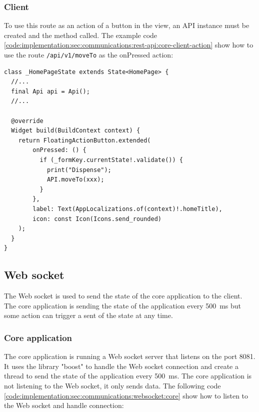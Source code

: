 \subsubsection{Client}
\label{ch:implementation:sec:communications:rest-api:client}

To use this route as an action of a button in the view, an API instance must be created and the method called.
The example code \ref{code:implementation:sec:communications:rest-api:core-client-action} show how to use the route \texttt{/api/v1/moveTo} as the onPressed action:

\begin{code}
  \label{code:implementation:sec:communications:rest-api:core-client-action}
  \begin{verbatim}
class _HomePageState extends State<HomePage> {
  //...
  final Api api = Api();
  //...

  @override
  Widget build(BuildContext context) {
    return FloatingActionButton.extended(
        onPressed: () {
          if (_formKey.currentState!.validate()) {
            print("Dispense");
            API.moveTo(xxx);
          }
        },
        label: Text(AppLocalizations.of(context)!.homeTitle),
        icon: const Icon(Icons.send_rounded)
    );
  }
}
  \end{verbatim}
\end{code}


\subsection{Web socket}
\label{ch:implementation:sec:communications:websocket}

The Web socket is used to send the state of the core application to the client.
The core application is sending the state of the application every 500~ms but some action can trigger a sent of the state at any time.

\subsubsection{Core application}
\label{ch:implementation:sec:communications:websocket:core}

The core application is running a Web socket server that listens on the port 8081.
It uses the library "boost" to handle the Web socket connection and create a thread to send the state of the application every 500~ms.
The core application is not listening to the Web socket, it only sends data.
The following code \ref{code:implementation:sec:communications:websocket:core} show how to listen to the Web socket and handle connection:

